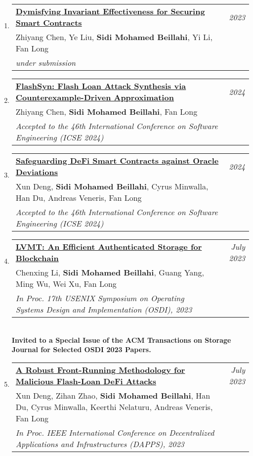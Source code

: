 \documentclass[10pt]{article}
\makeatletter
\newcommand{\lbar}[1]{{\color{#1}\ding{118}}\hspace*{2pt}}
\newenvironment{benumerate}[2]{
    \let\oldItem\item
    \def\item{\addtocounter{enumi}{-2}\oldItem}
    \begin{enumerate}[#2] \itemsep3pt
    \setcounter{enumi}{#1}
    \addtocounter{enumi}{1}}
  {\end{enumerate}}
\newenvironment{publication}[5]
{ \item
  \begin{tabular*}{7.5in}{p{6.3in}@{\extracolsep{\fill}}r}
    \href{#1}{\textbf{#2}} & \textit{#3}\\ #4 &\\ \textit{#5}&\\
  \end{tabular*}
} {}
\newenvironment{region}[3]{%
  \vspace*{0.5ex}
  {\scalebox{1.4}{\textbf{#1}}}
  \begin{benumerate}{#3}{\color{RoyalBlue}#2}}
  {\end{benumerate}\vspace{0.8ex}}
\makeatother
\begin{document}
\begin{region} {\lbar{black}Conference Publications}{{C}1}{17}

  \begin{publication} {https://beillahi.github.io}
		{Dymisfying Invariant Effectiveness for Securing Smart Contracts} 
		{2023} {Zhiyang Chen, Ye Liu, \textbf{Sidi Mohamed Beillahi}, Yi Li, Fan Long}
		{under submission}
  \end{publication}
 
  \begin{publication} {https://arxiv.org/pdf/2206.10708.pdf}
		{FlashSyn: Flash Loan Attack Synthesis via Counterexample-Driven Approximation} 
		{2024} {Zhiyang Chen, \textbf{Sidi Mohamed Beillahi}, Fan Long}
		{Accepted to the 46th International Conference on Software Engineering (ICSE 2024)}
  \end{publication}

  \begin{publication} {https://beillahi.github.io}
		{Safeguarding DeFi Smart Contracts against Oracle Deviations} 
		{2024} {Xun Deng, \textbf{Sidi Mohamed Beillahi}, Cyrus Minwalla, Han Du, Andreas Veneris, Fan Long}
		{Accepted to the 46th International Conference on Software Engineering (ICSE 2024)}
  \end{publication}



  \begin{publication} {https://beillahi.github.io/papers/OSDI23.pdf}
		{LVMT: An Efficient Authenticated Storage for Blockchain} 
		{July 2023} {Chenxing Li, \textbf{Sidi Mohamed Beillahi}, Guang Yang, Ming Wu, Wei Xu, Fan Long}
		{In Proc. 17th USENIX Symposium on Operating Systems Design and Implementation (OSDI), 2023}
    {\\ \textbf{Invited to a Special Issue of the ACM Transactions on Storage Journal for Selected OSDI 2023 Papers.}}
  \end{publication}

  \begin{publication} {https://beillahi.github.io/papers/DAPPS23.pdf}
		{A Robust Front-Running Methodology for Malicious Flash-Loan DeFi Attacks} 
		{July 2023} {Xun Deng, Zihan Zhao, \textbf{Sidi Mohamed Beillahi}, Han Du, Cyrus Minwalla, Keerthi Nelaturu, 
    Andreas Veneris, Fan Long}
		{In Proc. IEEE International Conference on Decentralized Applications and Infrastructures (DAPPS), 2023}
  \end{publication}
 

\end{region}
\end{document}
